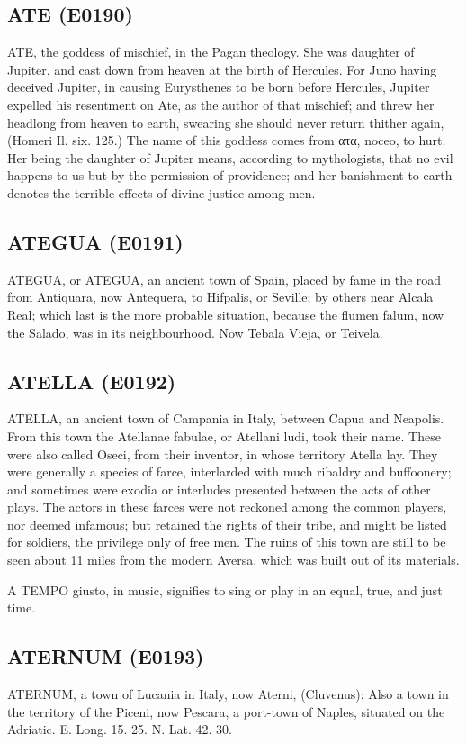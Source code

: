\documentclass{article}
\begin{document}
\subsection*{ATE (E0190)}
ATE, the goddess of mischief, in the Pagan theology. She was daughter of Jupiter, and cast down from heaven at the birth of Hercules. For Juno having deceived Jupiter, in causing Eurysthenes to be born before Hercules, Jupiter expelled his resentment on Ate, as the author of that mischief; and threw her headlong from heaven to earth, swearing she should never return thither again, (Homeri Il. six. 125.) The name of this goddess comes from ατα, noceo, to hurt. Her being the daughter of Jupiter means, according to mythologists, that no evil happens to us but by the permission of providence; and her banishment to earth denotes the terrible effects of divine justice among men.

\subsection*{ATEGUA (E0191)}
ATEGUA, or ATEGUA, an ancient town of Spain, placed by fame in the road from Antiquara, now Antequera, to Hifpalis, or Seville; by others near Alcala Real; which last is the more probable situation, because the flumen falum, now the Salado, was in its neighbourhood. Now Tebala Vieja, or Teivela.

\subsection*{ATELLA (E0192)}
ATELLA, an ancient town of Campania in Italy, between Capua and Neapolis. From this town the Atellanae fabulae, or Atellani ludi, took their name. These were also called Oseci, from their inventor, in whose territory Atella lay. They were generally a species of farce, interlarded with much ribaldry and buffoonery; and sometimes were exodia or interludes presented between the acts of other plays. The actors in these farces were not reckoned among the common players, nor deemed infamous; but retained the rights of their tribe, and might be listed for soldiers, the privilege only of free men. The ruins of this town are still to be seen about 11 miles from the modern Aversa, which was built out of its materials.

A TEMPO giusto, in music, signifies to sing or play in an equal, true, and just time.

\subsection*{ATERNUM (E0193)}
ATERNUM, a town of Lucania in Italy, now Aterni, (Cluvenus): Also a town in the territory of the Piceni, now Pescara, a port-town of Naples, situated on the Adriatic. E. Long. 15. 25. N. Lat. 42. 30.
\end{document}

